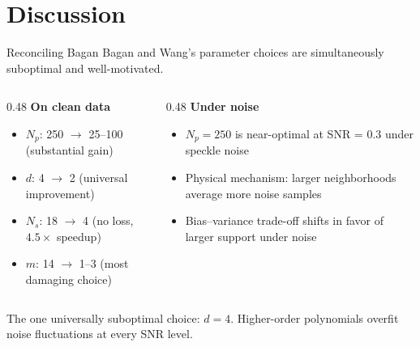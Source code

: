 \documentclass[10pt, aspectratio=169]{beamer}
\begin{document}
\section{Discussion}

\begin{frame}{Reconciling Bagan}
  Bagan and Wang's parameter choices are simultaneously suboptimal and well-motivated.

  \vspace{0.5em}
  \begin{columns}[T]
    \begin{column}{0.48\textwidth}
      \textbf{On clean data}
      \begin{itemize}
        \item $N_p$: 250 $\to$ 25--100 (substantial gain)
        \item $d$: 4 $\to$ 2 (universal improvement)
        \item $N_s$: 18 $\to$ 4 (no loss, $4.5\times$ speedup)
        \item $m$: 14 $\to$ 1--3 (most damaging choice)
      \end{itemize}
    \end{column}
    \begin{column}{0.48\textwidth}
      \textbf{Under noise}
      \begin{itemize}
        \item $N_p = 250$ is near-optimal at SNR = 0.3 under speckle noise
        \item Physical mechanism: larger neighborhoods average more noise samples
        \item Bias--variance trade-off shifts in favor of larger support under noise
      \end{itemize}
    \end{column}
  \end{columns}

  \vspace{0.5em}
  The one universally suboptimal choice: $d = 4$. Higher-order polynomials overfit noise fluctuations at every SNR level.
\end{frame}
\end{document}
